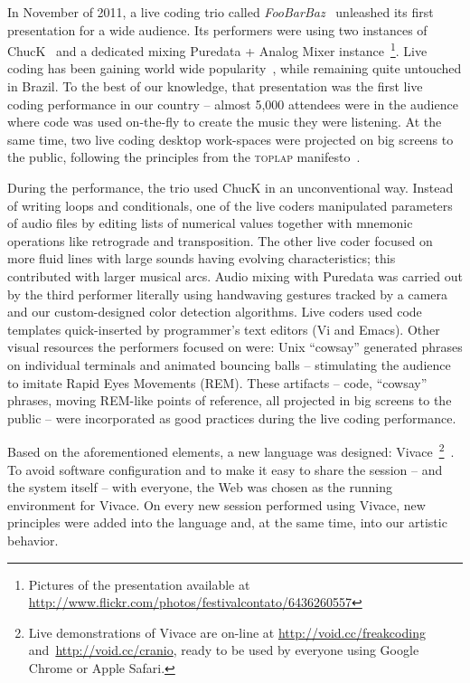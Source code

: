 \documentclass[letterpaper, 12pt]{article}
\begin{document}
{In November of 2011, a live coding trio called
\textit{FooBarBaz}~\citep{foobarbaz} unleashed its first presentation
for a wide audience. Its performers were using two instances of
ChucK~\citep{wang2003chuck} and a dedicated mixing Puredata + Analog
Mixer instance~\footnote{Pictures of the presentation available at
  \url{http://www.flickr.com/photos/festivalcontato/6436260557}}. Live
coding has been gaining world wide popularity~\citep{nilson2007live,
  collins2003live, brown2007a, collins2011live}, while remaining quite
untouched in Brazil. To the best of our knowledge, that presentation
was the first live coding performance in our country -- almost 5,000
attendees were in the audience where code was used on-the-fly to
create the music they were listening. At the same time, two live
coding desktop work-spaces were projected on big screens to the
public, following the principles from the \textsc{toplap}
manifesto~\citep{ward2004live}.

During the performance, the trio used ChucK in an unconventional
way. Instead of writing loops and conditionals, one of the live coders
manipulated parameters of audio files by editing lists of numerical
values together with mnemonic operations like retrograde and
transposition.  The other live coder focused on more fluid lines with
large sounds having evolving characteristics; this contributed with
larger musical arcs.  Audio mixing with Puredata was carried out by
the third performer literally using handwaving gestures tracked by a
camera and our custom-designed color detection algorithms. Live coders
used code templates quick-inserted by programmer's text editors (Vi
and Emacs). Other visual resources the performers focused on were:
Unix ``cowsay'' generated phrases on individual terminals and animated
bouncing balls -- stimulating the audience to imitate Rapid Eyes
Movements (REM). These artifacts -- code, ``cowsay'' phrases, moving
REM-like points of reference, all projected in big screens to the
public -- were incorporated as good practices during the live coding
performance.

Based on the aforementioned elements, a new language was designed:
Vivace~\footnote{Live demonstrations of Vivace are on-line at
    \url{http://void.cc/freakcoding} and~\url{http://void.cc/cranio},
    ready to be used by everyone using
  Google Chrome or Apple Safari.}~\citep{Vivace}.  To avoid software
configuration and to make it easy to share the session -- and the
system itself -- with everyone, the Web was chosen as the running
environment for Vivace. On every new session performed using Vivace,
new principles were added into the language and, at the same time,
into our artistic behavior.

}
\end{document}
